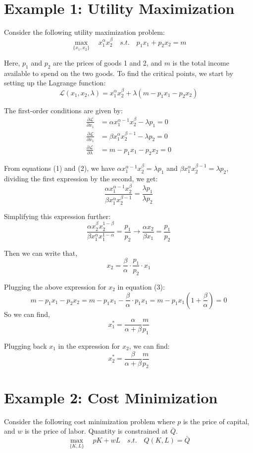 \documentclass{./../Latex/handout}
\begin{document}
\thispagestyle{plain}

\section*{Example 1: Utility Maximization}
Consider the following utility maximization problem:$$ \max_{\{x_1,x_2\}} \quad x_1^{\alpha} x_2^{\beta} \quad s.t. \quad p_1 x_1 + p_2 x_2 = m $$
 
 Here, $p_1$ and $p_2$ are the prices of goods 1 and 2, and $m$ is the total income available to spend on the two goods. 
 To find the critical points, we start by setting up the Lagrange function: 
  $$ \mathcal{L}(x_1,x_2,\lambda) =  x_1^{\alpha} x_2^{\beta} + \lambda(m-p_1 x_1-p_2 x_2)$$
  
The first-order conditions are given by:
\begin{align}
	\frac{\partial \mathcal{L}}{\partial x_1} &= \alpha x_1^{\alpha-1}x_2^{\beta}-\lambda p_1 = 0 \\ 
	 \frac{\partial \mathcal{L}}{\partial x_1} &= \beta x_1^{\alpha}x_2^{\beta-1}-\lambda p_2 = 0 \\
	  \frac{\partial \mathcal{L}}{\partial \lambda} &= m-p_1 x_1-p_2 x_2 = 0 
\end{align}

From equations (1) and (2), we have $\alpha x_1^{\alpha-1}x_2^{\beta}=\lambda p_1 $ and  $\beta x_1^{\alpha}x_2^{\beta-1}=\lambda p_2$, dividing the first expression by the second, we get:
$$ \frac{\alpha x_1^{\alpha-1}x_2^{\beta}}{\beta x_1^{\alpha}x_2^{\beta-1}} = \frac{\lambda p_1}{\lambda p_2}$$

Simplifying this expression further:
$$ \frac{\alpha x_2^{\beta}x_2^{1-\beta}}{\beta x_1^{\alpha}x_1^{1-\alpha}} = \frac{ p_1}{ p_2} \rightarrow \frac{\alpha x_2}{\beta x_1} = \frac{p_1}{p_2} $$

Then we can write that, 
$$ x_2 = \frac{\beta}{\alpha}\cdot\frac{p_1}{p_2} \cdot x_1$$

Plugging the above expression for $x_2$  in equation (3):
$$ m-p_1 x_1-p_2 x_2 = m-p_1 x_1- \frac{\beta}{\alpha}\cdot p_1 x_1 = m-p_1 x_1\left(1+ \frac{\beta}{\alpha}\right) =0  $$
So we can find, $$x^*_1 = \frac{\alpha}{\alpha+\beta}\frac{m}{p_1}$$

Plugging back $x_1$ in the expression for $x_2$, we can find:
$$x^*_2 = \frac{\beta}{\alpha+\beta}\frac{m}{p_2}$$ 

\section*{Example 2: Cost Minimization}
Consider the following cost minimization problem where $p$ is the price of capital, and $w$ is the price of labor. Quantity is constrained at $\bar{Q}$. 
$$ \max_{\{K,L\}} \quad p K + w L \quad s.t. \quad Q(K,L) = \bar{Q} $$
\end{document}
